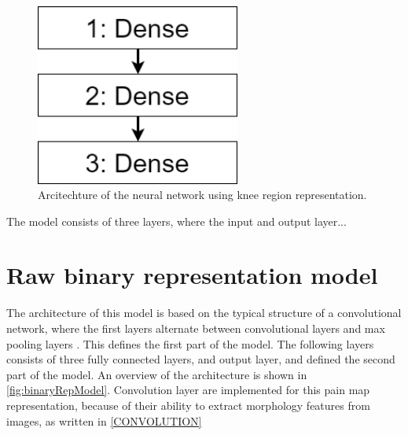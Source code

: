 \begin{figure} [H]
\centering
\includegraphics[width=0.6\textwidth]{figures/simpleModel}
\caption{Arcitechture of the neural network using knee region representation.}
\label{fig:simpleModel}  
\end{figure}

The model consists of three layers, where the input and output layer... 




\section{Raw binary representation model}\label{sec:binaryRepModel}
The architecture of this model is based on the typical structure of a convolutional network, where the first layers alternate between convolutional layers and max pooling layers \citep{LeCun2015}. This defines the first part of the model. The following layers consists of three fully connected layers, and output layer, and defined the second part of the model. An overview of the architecture is shown in \autoref{fig:binaryRepModel}.  
Convolution layer are implemented for this pain map representation, because of their ability to extract morphology features from images, as written in \autoref{CONVOLUTION}

